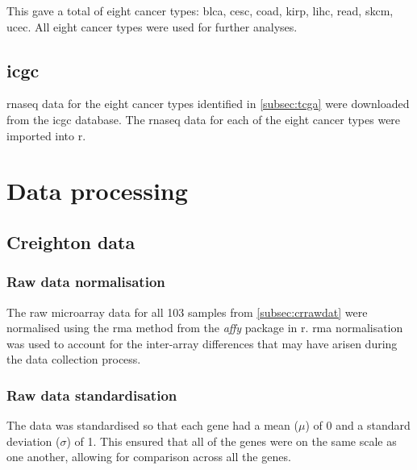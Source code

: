 This gave a total of eight cancer types: \gls{blca}, \gls{cesc}, \gls{coad}, \gls{kirp}, \gls{lihc}, \gls{read}, \gls{skcm}, \gls{ucec}.
All eight cancer types were used for further analyses.

\subsection{\gls{icgc}}
\label{subsec:icgc}

\gls{rnaseq} data for the eight cancer types identified in \cref{subsec:tcga} were downloaded from the \gls{icgc} database.
The \gls{rnaseq} data for each of the eight cancer types were imported into \gls{r}.





\section{Data processing}
\label{sec:datproc}

\subsection{Creighton data}
\label{subsec:crdatproc}


\subsubsection{\textbf{Raw data normalisation}}

The raw microarray data for all 103 samples from \cref{subsec:crrawdat} were normalised using the \gls{rma} method from the \textit{affy} package in \gls{r}.
\gls{rma} normalisation was used to account for the inter-array differences that may have arisen during the data collection process.

\subsubsection{\textbf{Raw data standardisation}}

The data was standardised so that each gene had a mean ($\mu$) of 0 and a standard deviation ($\sigma$) of 1.
This ensured that all of the genes were on the same scale as one another, allowing for comparison across all the genes.

